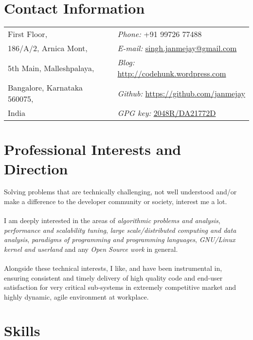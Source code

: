 \documentclass[margin,line]{res}
\begin{document}

\begin{resume}
  \section{\sc Contact Information}
  \vspace{.05in}
  \begin{tabular}{@{}p{2in}p{4in}}
    First Floor,                 & {\it Phone:}  +91 99726 77488 \\            
    186/A/2, Arnica Mont,        & {\it E-mail:}  \href{mailto:singh.janmejay@gmail.com}{singh.janmejay@gmail.com}\\       
    5th Main, Malleshpalaya,     & {\it Blog:}    \url{http://codehunk.wordpress.com} \\         
    Bangalore, Karnataka 560075, & {\it Github:} \url{https://github.com/janmejay} \\     
    India                        & {\it GPG key:} \href{http://pgp.mit.edu:11371/pks/lookup?op=vindex&search=0x3A9F2343DA21772D}{2048R/DA21772D}\\
  \end{tabular}


\section{\sc Professional Interests and Direction}
Solving problems that are technically challenging, not well understood and/or make a difference to the developer community or society, interest me a lot.\\
\\
I am deeply interested in the areas of {\it algorithmic problems and analysis}, {\it performance and scalability tuning}, {\it large scale/distributed computing and data analysis}, {\it paradigms of programming and programming languages}, {\it GNU/Linux kernel and userland} and any {\it Open Source work} in general.\\
\\
Alongside these technical interests, I like, and have been instrumental in, ensuring consistent and timely delivery of high quality code and end-user satisfaction for very critical sub-systems in extremely competitive market and highly dynamic, agile environment at workplace.

\section{\sc Skills}


\end{resume}
\end{document}
